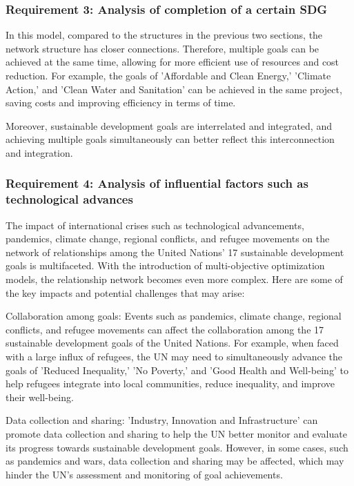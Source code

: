 \documentclass[10pt]{mcmthesis}
\begin{document}
\subsubsection{Requirement 3: Analysis of completion of a certain SDG}
In this model, compared to the structures in the previous two sections, the network structure has closer connections. Therefore, multiple goals can be achieved at the same time, allowing for more efficient use of resources and cost reduction. For example, the goals of 'Affordable and Clean Energy,' 'Climate Action,' and 'Clean Water and Sanitation' can be achieved in the same project, saving costs and improving efficiency in terms of time.

Moreover, sustainable development goals are interrelated and integrated, and achieving multiple goals simultaneously can better reflect this interconnection and integration.

\subsubsection{Requirement 4: Analysis of influential factors such as technological advances}

The impact of international crises such as technological advancements, pandemics, climate change, regional conflicts, and refugee movements on the network of relationships among the United Nations' 17 sustainable development goals is multifaceted. With the introduction of multi-objective optimization models, the relationship network becomes even more complex. Here are some of the key impacts and potential challenges that may arise:

Collaboration among goals: Events such as pandemics, climate change, regional conflicts, and refugee movements can affect the collaboration among the 17 sustainable development goals of the United Nations. For example, when faced with a large influx of refugees, the UN may need to simultaneously advance the goals of 'Reduced Inequality,' 'No Poverty,' and 'Good Health and Well-being' to help refugees integrate into local communities, reduce inequality, and improve their well-being.

Data collection and sharing: 'Industry, Innovation and Infrastructure' can promote data collection and sharing to help the UN better monitor and evaluate its progress towards sustainable development goals. However, in some cases, such as pandemics and wars, data collection and sharing may be affected, which may hinder the UN's assessment and monitoring of goal achievements.
\end{document}
